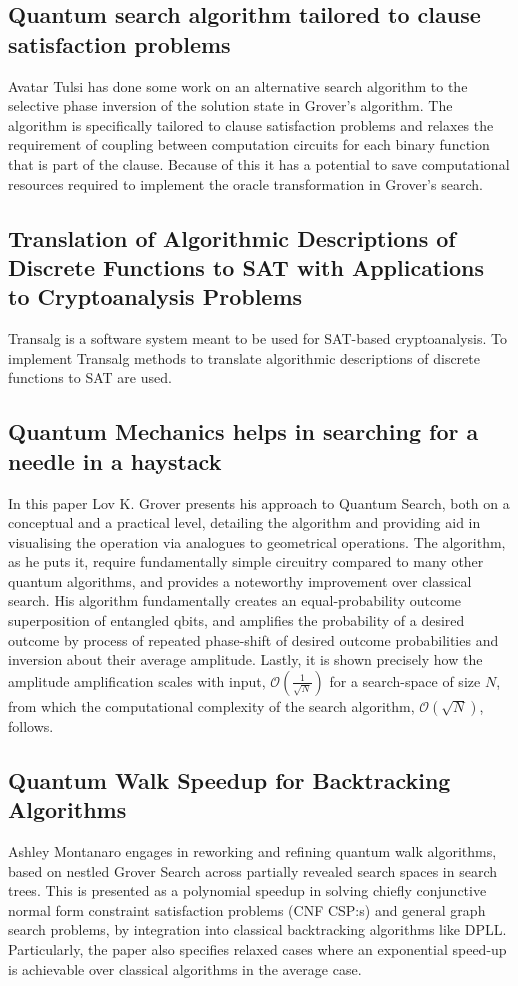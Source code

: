 \documentclass[msc,lith,english]{liuthesis}
\begin{document}
\subsection{Quantum search algorithm tailored to clause satisfaction problems}
Avatar Tulsi has done some work on an alternative search algorithm to the selective phase inversion of the solution state in Grover's algorithm. The algorithm is specifically tailored to clause satisfaction problems and relaxes the requirement of coupling between computation circuits for each binary function that is part of the clause. Because of this it has a potential to save computational resources required to implement the oracle transformation in Grover's search.\cite{QuantumCSPSearch}

\subsection{Translation of Algorithmic Descriptions of Discrete Functions to SAT with Applications to Cryptoanalysis Problems}
Transalg is a software system meant to be used for SAT-based cryptoanalysis. To implement Transalg methods to translate algorithmic descriptions of discrete functions to SAT are used.\cite{Transalg}

\subsection{Quantum Mechanics helps in searching for a needle in a haystack
}
In this paper Lov K. Grover presents his approach to Quantum Search, both on a conceptual and a practical level, detailing the algorithm and providing aid in visualising the operation via analogues to geometrical operations. The algorithm, as he puts it, require fundamentally simple circuitry compared to many other quantum algorithms, and provides a noteworthy improvement over classical search. His algorithm fundamentally creates an equal-probability outcome superposition of entangled qbits, and amplifies the probability of a desired outcome by process of repeated phase-shift of desired outcome probabilities and inversion about their average amplitude. Lastly, it is shown precisely how the amplitude amplification scales with input, $\mathcal{O}(\frac{1}{\sqrt{N}})$ for a search-space of size $N$, from which the computational complexity of the search algorithm, $\mathcal{O}(\sqrt{N})$, follows.\cite{QMHSNH}

\subsection{Quantum Walk Speedup for Backtracking Algorithms}
Ashley Montanaro engages in reworking and refining quantum walk algorithms, based on nestled Grover Search across partially revealed search spaces in search trees. This is presented as a polynomial speedup in solving chiefly conjunctive normal form constraint satisfaction problems (CNF CSP:s) and general graph search problems, by integration into classical backtracking algorithms like DPLL. Particularly, the paper also specifies relaxed cases where an exponential speed-up is achievable over classical algorithms in the average case.\cite{QWSBA}
\end{document}
